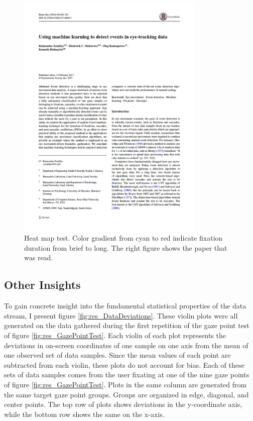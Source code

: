 \begin{figure}
\begin{minipage}{0.5\textwidth}
        \includegraphics[width=0.8\textwidth]{Images/DataQuality/Paper.png}
    \end{minipage}
    \caption{Heat map test. Color gradient from cyan to red indicate fixation duration from brief to long. The right figure shows the paper that was read.}
    \label{fig:res_PaperHeatmap}
\end{figure}

\subsection{Other Insights}

To gain concrete insight into the fundamental statistical properties of the data stream, I present figure \ref{fig:res_DataDeviations}. These violin plots were all generated on the data gathered during the first repetition of the gaze point test of figure \ref{fig:res_GazePointTest}. Each violin of each plot represents the deviations in on-screen coordinates of one sample on one axis from the mean of one observed set of data samples. Since the mean values of each point are subtracted from each violin, these plots do not account for bias. Each of these sets of data samples comes from the user fixating at one of the nine gaze points of figure \ref{fig:res_GazePointTest}. Plots in the same column are generated from the same target gaze point groups. Groups are organized in edge, diagonal, and center points. The top row of plots shows deviations in the y-coordinate axis, while the bottom row shows the same on the x-axis.

